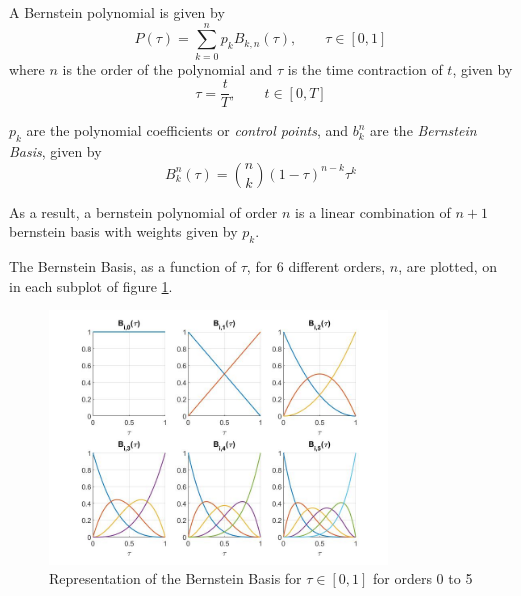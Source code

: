 \par A Bernstein polynomial is given by %
\begin{equation}
    \label{eq:bern_pol}
    P(\tau) = \sum_{k=0}^n p_k B_{k,n} (\tau), \qquad \tau\in [0,1]
\end{equation}
where $n$ is the order of the polynomial and $\tau$ is the time contraction of $t$, given by 
\begin{equation}
    \tau = \frac{t}{T}, \qquad t\in [0,T]
    \label{eq:time_delay}
\end{equation}

\par $p_k$ are the polynomial coefficients or \textit{control points}, and $b_k^n$ are the \textit{Bernstein Basis}, given by 
\begin{equation}
	B^n_k {(\tau)} = \binom{n}{k} {(1 - \tau)}^{n-k} \tau^k
    \label{eq:bern_basis}
\end{equation}
\par As a result, a bernstein polynomial of order $n$ is a linear combination of $n+1$ bernstein basis with weights given by $p_k$.

\par The Bernstein Basis, as a function of $\tau$, for 6 different orders, $n$, are plotted, on in each subplot of figure \ref{fig:bernsteinbasis}.

\begin{figure}[h!]
\centering
\includegraphics[width=0.8\textwidth]{Images/bernstein_basis.jpg}
\caption{Representation of the Bernstein Basis for $\tau \in [0,1]$ for orders 0 to 5}
\label{fig:bernsteinbasis}
\end{figure}

